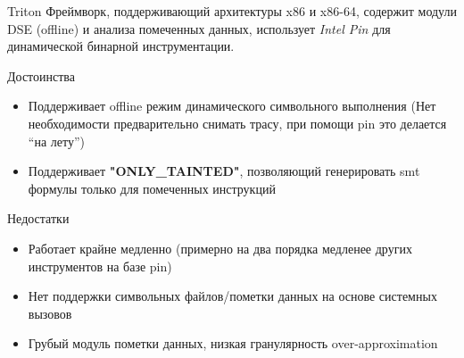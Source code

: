 \documentclass[10pt]{beamer}
\begin{document}
\begin{frame}{Triton}
    Фреймворк, поддерживающий архитектуры x86 и x86-64, содержит модули DSE (offline) и анализа помеченных данных, использует \emph{Intel Pin} для динамической бинарной инструментации.
    \begin{block}{Достоинства}
        \begin{itemize}
        \item Поддерживает offline режим динамического символьного выполнения (Нет необходимости предварительно снимать трасу, при помощи pin это делается ``на лету'')
        \item Поддерживает \textbf{"ONLY\_TAINTED"}, позволяющий генерировать smt формулы только для помеченных инструкций
        \end{itemize}
    \end{block}

      \begin{block}{Недостатки}
          \begin{itemize}
      \item Работает крайне медленно (примерно на два порядка медленее других инструментов на базе pin)
      \item Нет поддержки символьных файлов/пометки данных на основе системных вызовов
      \item Грубый модуль пометки данных, низкая гранулярность over-approximation
      \end{itemize}
    \end{block}

\end{frame}

\end{document}
